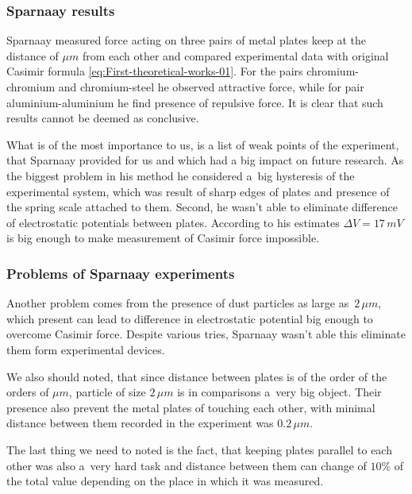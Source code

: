 \documentclass[10pt,t]{beamer}
\begin{document}
\begin{frame}
  \frametitle{Sparnaay results}


  Sparnaay measured force acting on three pairs of metal plates keep at the
  distance of $\mu\si{m}$ from each other and compared experimental data with
  original Casimir formula \eqref{eq:First-theoretical-works-01}. For the
  pairs chromium-chromium and chromium-steel he observed attractive force,
  while for pair aluminium-aluminium he find presence of repulsive force.
  It is clear that such results cannot be deemed as conclusive.

  What is of the most importance to us, is a list of weak points of the
  experiment, that Sparnaay provided for us and which had a big impact on
  future research. As the biggest problem in his method he considered a~big
  hysteresis of the experimental system, which was result of sharp edges of
  plates and presence of the spring scale attached to them. Second, he
  wasn't able to eliminate difference of electrostatic potentials between
  plates. According to his estimates $\Delta V = 17 \, \si{mV}$ is big enough to
  make measurement of Casimir force impossible.

\end{frame}





\begin{frame}
  \frametitle{Problems of Sparnaay experiments}


  Another problem comes from the presence of dust particles as large
  as~$2 \, \mu\si{m}$, which present can lead to difference in electrostatic
  potential big enough to overcome Casimir force. Despite various tries,
  Sparnaay wasn't able this eliminate them form experimental devices.

  We also should noted, that since distance between plates is of the order
  of the orders of $\mu\si{m}$, particle of size $2 \, \mu\si{m}$ is in
  comparisons a~very big object. Their presence also prevent the metal
  plates of touching each other, with minimal distance between them
  recorded in the experiment was $0.2 \, \mu\si{m}$.

  The last thing we need to noted is the fact, that keeping plates parallel
  to each other was also a~very hard task and distance between them can
  change of $10\%$ of the total value depending on the place in which it
  was measured.

\end{frame}
\end{document}

